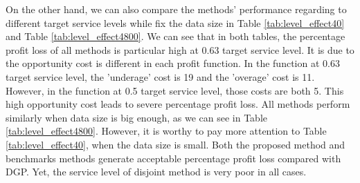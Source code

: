 \documentclass{article}
\begin{document}
On the other hand, we can also compare the methods' performance regarding to different target service levels while fix the data size in Table \ref{tab:level_effect40} and Table \ref{tab:level_effect4800}. We can see that in both tables, the percentage profit loss of all methods is particular high at 0.63 target service level. It is due to the opportunity cost is different in each profit function. In the function at 0.63 target service level, the 'underage' cost is 19 and the 'overage' cost is 11. However, in the function at 0.5 target service level, those costs are both 5. This high opportunity cost leads to severe percentage profit loss. All methods perform similarly when data size is big enough, as we can see in Table \ref{tab:level_effect4800}. However, it is worthy to pay more attention to Table \ref{tab:level_effect40}, when the data size is small. Both the proposed method and benchmarks methods generate acceptable percentage profit loss compared with DGP. Yet, the service level of disjoint method is very poor in all cases.

\begin{table}[ht]
\caption{Target service level effect on percentage profit loss and service level at 40 data size}
\label{tab:level_effect40}
\centering
{}
\end{table}
\end{document}
